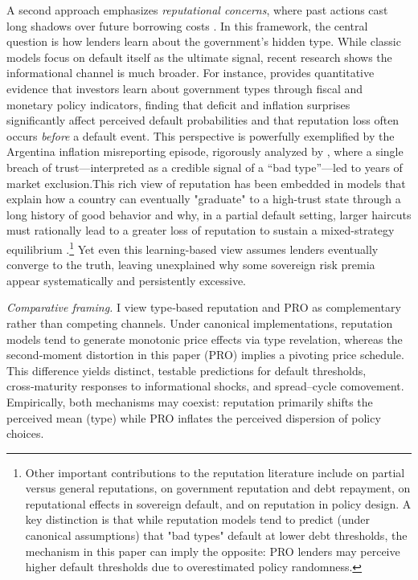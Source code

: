 \documentclass[12pt]{article}
\theoremstyle{plain}
\begin{document}
A second approach emphasizes \textit{reputational concerns}, where past actions
cast long shadows over future borrowing costs \citep{ColeDowEnglish1995,
	Phelan2006}. In this framework, the central question is how lenders learn about
the government's hidden type. While classic models focus on default itself as
the ultimate signal, recent research shows the informational channel is much
broader. For instance, \citep{Fourakis2021} provides quantitative evidence that
investors learn about government types through fiscal and monetary policy
indicators, finding that deficit and inflation surprises significantly affect
perceived default probabilities and that reputation loss often occurs
\textit{before} a default event. This perspective is powerfully exemplified by
the Argentina inflation misreporting episode, rigorously analyzed by
\citep{MorelliMoretti2023}, where a single breach of trust—interpreted as a
credible signal of a ``bad type''—led to years of market exclusion.This rich
view of reputation has been embedded in models that explain how a country can
eventually "graduate" to a high-trust state through a long history of good
behavior \citep{AmadorPhelan2021} and why, in a partial default setting, larger
haircuts must rationally lead to a greater loss of reputation to sustain a
mixed-strategy equilibrium \citep{AmadorPhelan2023}.\footnote{Other important
	contributions to the reputation literature include \citep{ColeKehoe1998} on
	partial versus general reputations, \citep{DErasmo2011} on government
	reputation and debt repayment, \citep{EgorovFabinger2016} on reputational
	effects in sovereign default, and \citep{DovisKirpalani2020,
		DovisKirpalani2021} on reputation in policy design. A key distinction is that
	while reputation models tend to predict (under canonical assumptions) that "bad
	types" default at lower debt thresholds, the mechanism in this paper can imply
	the opposite: PRO lenders may perceive higher default thresholds due to
	overestimated policy randomness.} Yet even this learning-based view assumes
lenders eventually converge to the truth, leaving unexplained why some
sovereign risk premia appear systematically and persistently excessive.

\noindent\textit{Comparative framing.} I view type‑based reputation and PRO as complementary rather than competing channels. Under canonical implementations, reputation models tend to generate monotonic price effects via type revelation, whereas the second‑moment distortion in this paper (PRO) implies a pivoting price schedule. This difference yields distinct, testable predictions for default thresholds, cross‑maturity responses to informational shocks, and spread–cycle comovement. Empirically, both mechanisms may coexist: reputation primarily shifts the perceived mean (type) while PRO inflates the perceived dispersion of policy choices.
\end{document}
